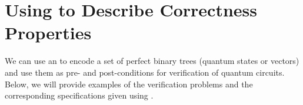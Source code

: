 \newcommand{\figBVcircuit}[0]{
\begin{wrapfigure}[14]{r}{0.42\textwidth}
    \vspace{-5mm}
    \centering
    \scalebox{0.7}{
    \begin{quantikz}
    \lstick{$\ket{s_1}$}\gategroup[wires=1,steps=8,style={rounded corners,fill=blue!10,draw opacity=0},background]{} && \ctrl{7} \gategroup[wires=8,steps=4,style={dashed,
    rounded corners,fill=blue!10,draw opacity=0},background]{} &&&&& \\
    \lstick{$\ket{0}$} & \gate{H} & \ctrl{0} &&&& \gate{H} & \\
    \lstick{$\ket{s_2}$}\gategroup[wires=1,steps=8,style={rounded corners,fill=blue!10,draw opacity=0},background]{} &&& \ctrl{5} &&&&\\
    \lstick{$\ket{0}$} & \gate{H} && \ctrl{0} &&& \gate{H}  & \\
    \lstick{$\dots$}  \\
    \lstick{$\ket{s_n}$}\gategroup[wires=1,steps=8,style={rounded corners,fill=blue!10,draw opacity=0},background]{} &&&&& \ctrl{2} &&\\
    \lstick{$\ket{0}$} & \gate{H} &&&& \ctrl{0} &\gate{H}  &\\
    \lstick{$\ket{1}$} & \gate{H} & \targ{} & \targ{} & \dots & \targ{} & \gate{H} &
    \end{quantikz}
    }

    \vspace{-2mm}
    \caption{BV circuit. Standard Toffoli gates have two $\bullet$ as controls
    and one $\oplus$ as the target.}
    \label{fig:bv-circuit}
\end{wrapfigure}
}

\vspace{-0.0mm}
\section{Using \lstas to Describe Correctness Properties}
\label{sec:properties}
\vspace{-0.0mm}
We can use an \lsta to encode a set of perfect binary trees (quantum states or
vectors) and use them as pre- and post-conditions for verification of quantum
circuits.
Below, we will provide examples of the verification problems and the
corresponding specifications given using \lstas.

